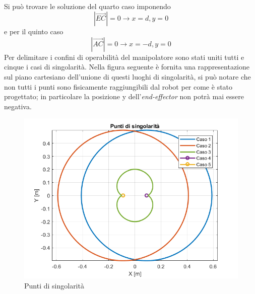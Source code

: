\\Si può trovare le soluzione del quarto caso imponendo \begin{equation}|\overrightarrow{EC}| = 0 \rightarrow x=d, y = 0
\end{equation}
e per il quinto caso 
\begin{equation}
	|\overrightarrow{AC}| = 0 \rightarrow x=-d, y=0
\end{equation}
Per delimitare i confini di operabilità del manipolatore sono stati uniti tutti e cinque i casi di singolarità. Nella figura seguente è fornita una rappresentazione sul piano cartesiano dell'unione di questi luoghi di singolarità, si può notare che non tutti i punti sono fisicamente raggiungibili dal robot per come è stato progettato; in particolare la posizione y dell'\textit{end-effector} non potrà mai essere negativa.
\begin{figure}[ht]
\begin{center}
    \includegraphics[scale=0.6]{Immagini/Singolarity/SingNewNew}
    \caption{Punti di singolarità}
    \label{puntiSing}
\end{center}
\end{figure}
